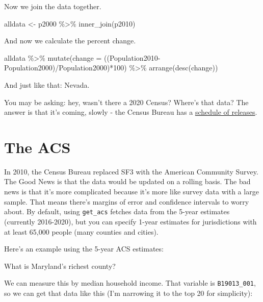 \documentclass[
  letterpaper,
  DIV=11,
  numbers=noendperiod]{scrreprt}
\newenvironment{Shaded}{\begin{snugshade}}{\end{snugshade}}
\newcommand{\AttributeTok}[1]{\textcolor[rgb]{0.40,0.45,0.13}{#1}}
\newcommand{\DecValTok}[1]{\textcolor[rgb]{0.68,0.00,0.00}{#1}}
\newcommand{\FunctionTok}[1]{\textcolor[rgb]{0.28,0.35,0.67}{#1}}
\newcommand{\NormalTok}[1]{\textcolor[rgb]{0.00,0.23,0.31}{#1}}
\newcommand{\OtherTok}[1]{\textcolor[rgb]{0.00,0.23,0.31}{#1}}
\newcommand{\SpecialCharTok}[1]{\textcolor[rgb]{0.37,0.37,0.37}{#1}}
\begin{document}
Now we join the data together.

\begin{Shaded}
\begin{Highlighting}[]
\NormalTok{alldata }\OtherTok{\textless{}{-}}\NormalTok{ p2000 }\SpecialCharTok{\%\textgreater{}\%} \FunctionTok{inner\_join}\NormalTok{(p2010)}
\end{Highlighting}
\end{Shaded}

And now we calculate the percent change.

\begin{Shaded}
\begin{Highlighting}[]
\NormalTok{alldata }\SpecialCharTok{\%\textgreater{}\%} \FunctionTok{mutate}\NormalTok{(}\AttributeTok{change =}\NormalTok{ ((Population2010}\SpecialCharTok{{-}}\NormalTok{Population2000)}\SpecialCharTok{/}\NormalTok{Population2000)}\SpecialCharTok{*}\DecValTok{100}\NormalTok{) }\SpecialCharTok{\%\textgreater{}\%} \FunctionTok{arrange}\NormalTok{(}\FunctionTok{desc}\NormalTok{(change))}
\end{Highlighting}
\end{Shaded}

And just like that: Nevada.

You may be asking: hey, wasn't there a 2020 Census? Where's that data?
The answer is that it's coming, slowly - the Census Bureau has a
\href{https://www.census.gov/programs-surveys/popest/about/schedule.html}{schedule
of releases}.

\hypertarget{the-acs}{%
\section{The ACS}\label{the-acs}}

In 2010, the Census Bureau replaced SF3 with the American Community
Survey. The Good News is that the data would be updated on a rolling
basis. The bad news is that it's more complicated because it's more like
survey data with a large sample. That means there's margins of error and
confidence intervals to worry about. By default, using \texttt{get\_acs}
fetches data from the 5-year estimates (currently 2016-2020), but you
can specify 1-year estimates for jurisdictions with at least 65,000
people (many counties and cities).

Here's an example using the 5-year ACS estimates:

What is Maryland's richest county?

We can measure this by median household income. That variable is
\texttt{B19013\_001}, so we can get that data like this (I'm narrowing
it to the top 20 for simplicity):
\end{document}
